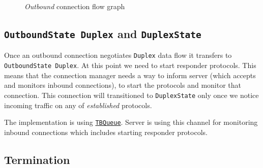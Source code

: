 \documentclass{article}
\def\OutboundStateUni{\texttt{OutboundState Unidirectional}}
\def\OutboundStateDup{\texttt{OutboundState Duplex}}
\def\DuplexState{\texttt{DuplexState}}
\def\InboundStateDup{\texttt{InboundState Duplex}}
\def\established{\textit{established}}
\begin{document}
\begin{figure}[p]
{}
  \caption{\textit{Outbound} connection flow graph}
  \label{fig:outbound_flow}
\end{figure}

\subsection{\OutboundStateDup{} and \DuplexState{}}
Once an outbound connection negotiates \texttt{Duplex} data flow it transfers
to \OutboundStateDup{}.  At this point we need to start responder protocols.
This means that the connection manager needs a way to inform server (which
accepts and monitors inbound connections), to start the protocols and monitor
that connection.  This connection will transitioned to \DuplexState{} only once
we notice incoming traffic on any of \established{} protocols.

The implementation is using
\href{https://github.com/input-output-hk/ouroboros-network/blob/coot/connection-manager/ouroboros-network-framework/src/Ouroboros/Network/ConnectionManager/Server/ControlChannel.hs\#L123}{\texttt{TBQueue}}.
Server is using this channel for monitoring inbound connections which includes
starting responder protocols.

\subsection{Termination}\label{sec:outbound_termination}
\end{document}
